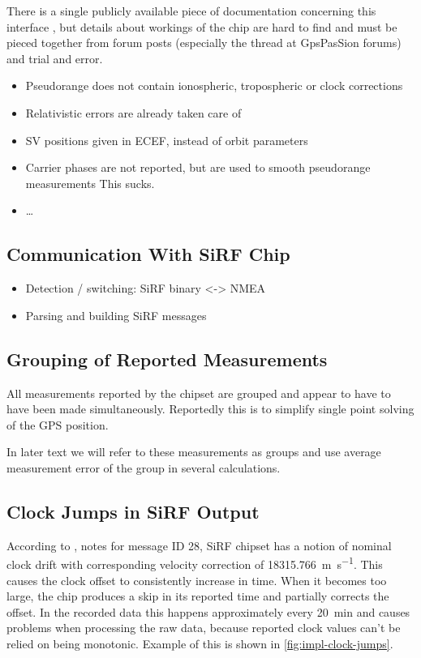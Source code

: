 There is a single publicly available piece of documentation concerning this
interface \cite{sirf-protocol}, but details about workings of the chip are hard
to find and must be pieced together from forum posts (especially the thread
\cite{gpspassion-sirf} at GpsPasSion forums) and trial and error.


\begin{itemize}
\item Pseudorange does not contain ionospheric, tropospheric or clock corrections
\item Relativistic errors are already taken care of 
\item SV positions given in ECEF, instead of orbit parameters
\item Carrier phases are not reported, but are used to smooth pseudorange measurements
    This sucks.
\item \ldots
\end{itemize}

\subsection{Communication With SiRF Chip}
\begin{itemize}
\item Detection / switching: SiRF binary <-> NMEA
\item Parsing and building SiRF messages
\end{itemize}

\subsection{Grouping of Reported Measurements}
All measurements reported by the chipset are grouped and appear
to have to have been made simultaneously.
Reportedly this is to simplify single point solving of the GPS position.

In later text we will refer to these measurements as groups and use average
measurement error of the group in several calculations.

\subsection{Clock Jumps in SiRF Output}
According to \cite{sirf-protocol}, notes for message ID 28, SiRF chipset has a
notion of nominal clock drift with corresponding velocity correction of \SI{18315.766}{\meter\per\second}.
This causes the clock offset to consistently increase in time.
When it becomes too large, the chip produces a skip in its reported time and
partially corrects the offset.
In the recorded data this happens approximately every \SI{20}{\minute} and causes
problems when processing the raw data, because reported clock values
can't be relied on being monotonic.
Example of this is shown in \cref{fig:impl-clock-jumps}.

